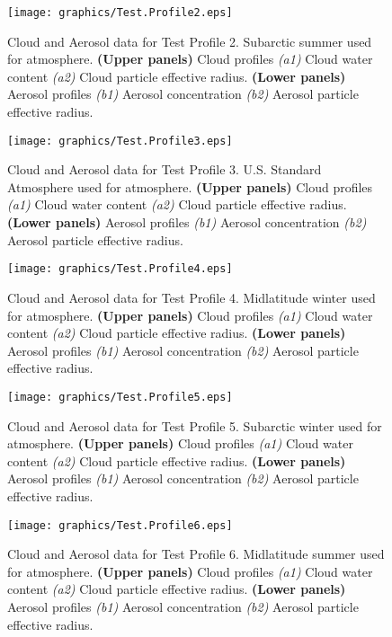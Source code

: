 \begin{figure}[htp]
  \centering
  \texttt{[image: graphics/Test.Profile2.eps]}
  \caption{Cloud and Aerosol data for Test Profile 2. Subarctic summer used for atmosphere.
    \textbf{(Upper panels)} Cloud profiles \textit{(a1)} Cloud water content \textit{(a2)} Cloud particle effective radius.
    \textbf{(Lower panels)} Aerosol profiles \textit{(b1)} Aerosol concentration \textit{(b2)} Aerosol particle effective radius.}
  \label{fig:Test.Profile2}
\end{figure}

\begin{figure}[htp]
  \centering
  \texttt{[image: graphics/Test.Profile3.eps]}
  \caption{Cloud and Aerosol data for Test Profile 3. U.S. Standard Atmosphere used for atmosphere.
    \textbf{(Upper panels)} Cloud profiles \textit{(a1)} Cloud water content \textit{(a2)} Cloud particle effective radius.
    \textbf{(Lower panels)} Aerosol profiles \textit{(b1)} Aerosol concentration \textit{(b2)} Aerosol particle effective radius.}
  \label{fig:Test.Profile3}
\end{figure}

\begin{figure}[htp]
  \centering
  \texttt{[image: graphics/Test.Profile4.eps]}
  \caption{Cloud and Aerosol data for Test Profile 4. Midlatitude winter used for atmosphere.
    \textbf{(Upper panels)} Cloud profiles \textit{(a1)} Cloud water content \textit{(a2)} Cloud particle effective radius.
    \textbf{(Lower panels)} Aerosol profiles \textit{(b1)} Aerosol concentration \textit{(b2)} Aerosol particle effective radius.}
  \label{fig:Test.Profile4}
\end{figure}

\begin{figure}[htp]
  \centering
  \texttt{[image: graphics/Test.Profile5.eps]}
  \caption{Cloud and Aerosol data for Test Profile 5. Subarctic winter used for atmosphere.
    \textbf{(Upper panels)} Cloud profiles \textit{(a1)} Cloud water content \textit{(a2)} Cloud particle effective radius.
    \textbf{(Lower panels)} Aerosol profiles \textit{(b1)} Aerosol concentration \textit{(b2)} Aerosol particle effective radius.}
  \label{fig:Test.Profile5}
\end{figure}

\begin{figure}[htp]
  \centering
  \texttt{[image: graphics/Test.Profile6.eps]}
  \caption{Cloud and Aerosol data for Test Profile 6. Midlatitude summer used for atmosphere.
    \textbf{(Upper panels)} Cloud profiles \textit{(a1)} Cloud water content \textit{(a2)} Cloud particle effective radius.
    \textbf{(Lower panels)} Aerosol profiles \textit{(b1)} Aerosol concentration \textit{(b2)} Aerosol particle effective radius.}
  \label{fig:Test.Profile6}
\end{figure}
